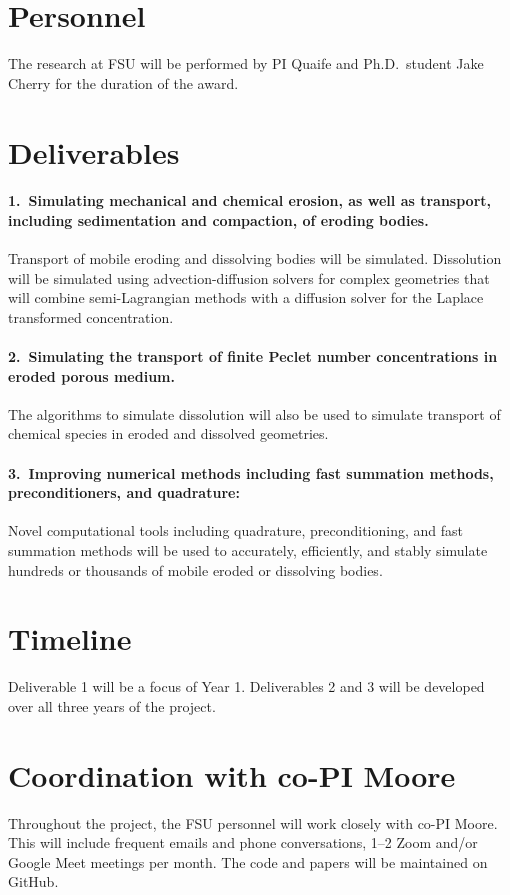 \documentclass[11pt]{article}
\begin{document}
\section*{Personnel}
The research at FSU will be performed by PI Quaife and Ph.D.~student
Jake Cherry for the duration of the award.

\section*{Deliverables}
\paragraph{1.~Simulating mechanical and chemical erosion, as well as
transport, including sedimentation and compaction, of eroding bodies.}
Transport of mobile eroding and dissolving bodies will be simulated.
Dissolution will be simulated using advection-diffusion solvers for
complex geometries that will combine semi-Lagrangian methods with a
diffusion solver for the Laplace transformed concentration.
    
\paragraph{2.~Simulating the transport of finite Peclet number
concentrations in eroded porous medium.} The algorithms to simulate
dissolution will also be used to simulate transport of chemical species
in eroded and dissolved geometries.

\paragraph{3.~Improving numerical methods including fast summation
methods, preconditioners, and quadrature:} Novel computational tools
including quadrature, preconditioning, and fast summation methods will
be used to accurately, efficiently, and stably simulate hundreds or
thousands of mobile eroded or dissolving bodies.

\section*{Timeline}
Deliverable 1 will be a focus of Year 1. Deliverables 2 and 3 will be
developed over all three years of the project.

\section*{Coordination with co-PI Moore}
Throughout the project, the FSU personnel will work closely with co-PI
Moore. This will include frequent emails and phone conversations, 1--2
Zoom and/or Google Meet meetings per month. The code and papers will be
maintained on GitHub.
\end{document}

